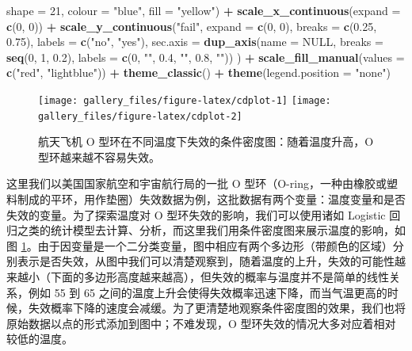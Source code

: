 \documentclass[
  b5paper,
  UTF8,twoside]{book}
\newenvironment{Shaded}{\begin{snugshade}}{\end{snugshade}}
\newcommand{\AttributeTok}[1]{\textcolor[rgb]{0.13,0.29,0.53}{#1}}
\newcommand{\ConstantTok}[1]{\textcolor[rgb]{0.56,0.35,0.01}{#1}}
\newcommand{\DecValTok}[1]{\textcolor[rgb]{0.00,0.00,0.81}{#1}}
\newcommand{\FloatTok}[1]{\textcolor[rgb]{0.00,0.00,0.81}{#1}}
\newcommand{\FunctionTok}[1]{\textcolor[rgb]{0.13,0.29,0.53}{\textbf{#1}}}
\newcommand{\NormalTok}[1]{#1}
\newcommand{\SpecialCharTok}[1]{\textcolor[rgb]{0.81,0.36,0.00}{\textbf{#1}}}
\newcommand{\StringTok}[1]{\textcolor[rgb]{0.31,0.60,0.02}{#1}}
\begin{document}
\begin{Shaded}
\begin{Highlighting}[]
    \AttributeTok{shape =} \DecValTok{21}\NormalTok{, }\AttributeTok{colour =} \StringTok{"blue"}\NormalTok{, }\AttributeTok{fill =} \StringTok{"yellow"}\NormalTok{) }\SpecialCharTok{+}
  \FunctionTok{scale\_x\_continuous}\NormalTok{(}\AttributeTok{expand =} \FunctionTok{c}\NormalTok{(}\DecValTok{0}\NormalTok{, }\DecValTok{0}\NormalTok{)) }\SpecialCharTok{+}
  \FunctionTok{scale\_y\_continuous}\NormalTok{(}\StringTok{"fail"}\NormalTok{, }\AttributeTok{expand =} \FunctionTok{c}\NormalTok{(}\DecValTok{0}\NormalTok{, }\DecValTok{0}\NormalTok{), }\AttributeTok{breaks =} \FunctionTok{c}\NormalTok{(}\FloatTok{0.25}\NormalTok{, }\FloatTok{0.75}\NormalTok{), }
    \AttributeTok{labels =} \FunctionTok{c}\NormalTok{(}\StringTok{"no"}\NormalTok{, }\StringTok{"yes"}\NormalTok{),}
    \AttributeTok{sec.axis =} \FunctionTok{dup\_axis}\NormalTok{(}\AttributeTok{name =} \ConstantTok{NULL}\NormalTok{, }
      \AttributeTok{breaks =} \FunctionTok{seq}\NormalTok{(}\DecValTok{0}\NormalTok{, }\DecValTok{1}\NormalTok{, }\FloatTok{0.2}\NormalTok{), }
      \AttributeTok{labels =} \FunctionTok{c}\NormalTok{(}\DecValTok{0}\NormalTok{, }\StringTok{""}\NormalTok{, }\FloatTok{0.4}\NormalTok{, }\StringTok{""}\NormalTok{, }\FloatTok{0.8}\NormalTok{, }\StringTok{""}\NormalTok{))}
\NormalTok{  ) }\SpecialCharTok{+}
  \FunctionTok{scale\_fill\_manual}\NormalTok{(}\AttributeTok{values =} \FunctionTok{c}\NormalTok{(}\StringTok{"red"}\NormalTok{, }\StringTok{"lightblue"}\NormalTok{)) }\SpecialCharTok{+}
  \FunctionTok{theme\_classic}\NormalTok{() }\SpecialCharTok{+}
  \FunctionTok{theme}\NormalTok{(}\AttributeTok{legend.position =} \StringTok{"none"}\NormalTok{)}
\end{Highlighting}
\end{Shaded}

\begin{figure}

{\centering \texttt{[image: gallery\_files/figure-latex/cdplot-1]} \texttt{[image: gallery\_files/figure-latex/cdplot-2]} 

}

\caption[航天飞机 O 型环在不同温度下失效的条件密度图]{航天飞机 O 型环在不同温度下失效的条件密度图：随着温度升高，O 型环越来越不容易失效。}\label{fig:cdplot}
\end{figure}

这里我们以美国国家航空和宇宙航行局的一批 O 型环（O-ring，一种由橡胶或塑料制成的平环，用作垫圈）失效数据为例，这批数据有两个变量：温度变量和是否失效的变量。为了探索温度对 O 型环失效的影响，我们可以使用诸如 Logistic 回归之类的统计模型去计算、分析，而这里我们用条件密度图来展示温度的影响，如图 \ref{fig:cdplot}。由于因变量是一个二分类变量，图中相应有两个多边形（带颜色的区域）分别表示是否失效，从图中我们可以清楚观察到，随着温度的上升，失效的可能性越来越小（下面的多边形高度越来越高），但失效的概率与温度并不是简单的线性关系，例如 55 到 65 之间的温度上升会使得失效概率迅速下降，而当气温更高的时候，失效概率下降的速度会减缓。为了更清楚地观察条件密度图的效果，我们也将原始数据以点的形式添加到图中；不难发现，O 型环失效的情况大多对应着相对较低的温度。
\end{document}

